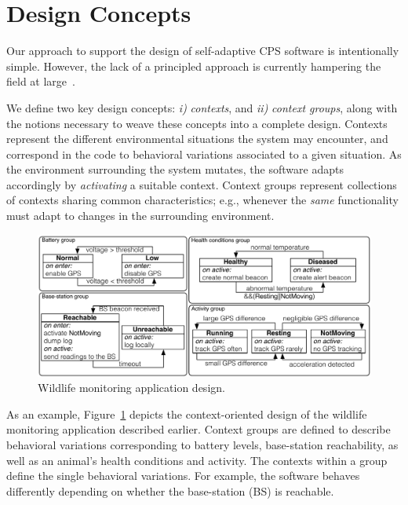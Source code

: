 \section{Design Concepts}
\label{sec:design}

Our approach to support the design of self-adaptive CPS software is
intentionally simple. However, the lack of a principled approach is
currently hampering the field at
large~\cite{Picco:2010:SEW:1882362.1882421}. %

We define two key design concepts: \emph{i)} \emph{contexts}, and
\emph{ii)} \emph{context groups}, along with the notions necessary to
weave these concepts into a complete design.  Contexts represent the
different environmental situations the system may encounter, and
correspond in the code to behavioral variations associated to a given
situation. As the environment surrounding the system mutates, the
software adapts accordingly by \emph{activating} a suitable
context. Context groups represent collections of contexts sharing
common characteristics; e.g., whenever the \emph{same} functionality
must adapt to changes in the surrounding environment. 

\begin{figure}
\begin{center}
\includegraphics[scale=.43]{imgs/wildlifetracking-simple}
\vspace{-6mm}
\caption{Wildlife monitoring application design.}
  \label{fig:design}
\vspace{-8mm}
\end{center}
\end{figure}

As an example, Figure~\ref{fig:design} depicts the
context-oriented design of the wildlife monitoring application
described earlier. Context groups are defined to describe behavioral
variations corresponding to battery levels, base-station reachability,
as well as an animal's health conditions and activity. The contexts
within a group define the single behavioral variations. For example,
the software behaves differently depending on whether the
base-station (BS) is reachable. 

